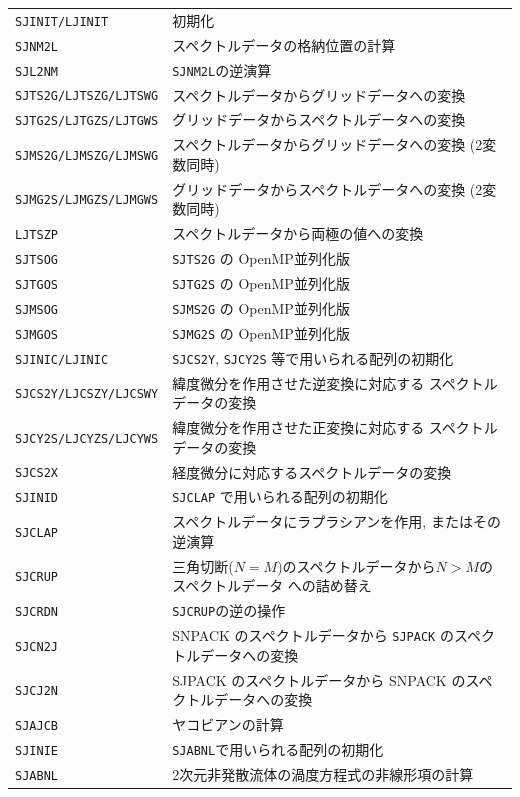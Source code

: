 \documentclass[a4j]{jarticle}
\begin{document}
\vspace{1em}
\begin{tabular}{ll}
{\tt SJINIT/LJINIT} & 初期化\\
{\tt SJNM2L} & スペクトルデータの格納位置の計算\\
{\tt SJL2NM} & {\tt SJNM2L}の逆演算\\
{\tt SJTS2G/LJTSZG/LJTSWG} & スペクトルデータからグリッドデータへの変換\\
{\tt SJTG2S/LJTGZS/LJTGWS} & グリッドデータからスペクトルデータへの変換\\
{\tt SJMS2G/LJMSZG/LJMSWG} & スペクトルデータからグリッドデータへの変換
(2変数同時)\\
{\tt SJMG2S/LJMGZS/LJMGWS} & グリッドデータからスペクトルデータへの変換
(2変数同時)\\
{\tt LJTSZP} & スペクトルデータから両極の値への変換\\
{\tt SJTSOG} & {\tt SJTS2G} の OpenMP並列化版\\
{\tt SJTGOS} & {\tt SJTG2S} の OpenMP並列化版\\
{\tt SJMSOG} & {\tt SJMS2G} の OpenMP並列化版\\
{\tt SJMGOS} & {\tt SJMG2S} の OpenMP並列化版\\
{\tt SJINIC/LJINIC} & {\tt SJCS2Y}, {\tt SJCY2S} 等で用いられる配列の初期化\\
{\tt SJCS2Y/LJCSZY/LJCSWY} & 緯度微分を作用させた逆変換に対応する
スペクトルデータの変換\\
{\tt SJCY2S/LJCYZS/LJCYWS} & 緯度微分を作用させた正変換に対応する
スペクトルデータの変換\\
{\tt SJCS2X} & 経度微分に対応するスペクトルデータの変換\\
{\tt SJINID} & {\tt SJCLAP} で用いられる配列の初期化\\
{\tt SJCLAP} & スペクトルデータにラプラシアンを作用, またはその逆演算\\
{\tt SJCRUP} & 三角切断($N=M$)のスペクトルデータから$N>M$のスペクトルデータ
への詰め替え\\
{\tt SJCRDN} & {\tt SJCRUP}の逆の操作 \\
{\tt SJCN2J} & SNPACK のスペクトルデータから 
 {\tt SJPACK} のスペクトルデータへの変換\\
{\tt SJCJ2N} & SJPACK のスペクトルデータから 
  SNPACK のスペクトルデータへの変換\\
{\tt SJAJCB} & ヤコビアンの計算\\
{\tt SJINIE} & {\tt SJABNL}で用いられる配列の初期化\\
{\tt SJABNL} & 2次元非発散流体の渦度方程式の非線形項の計算
\end{tabular}
\end{document}
